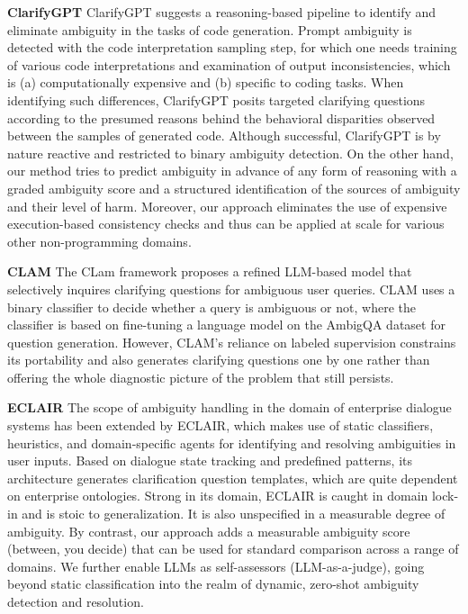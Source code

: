 \documentclass[11pt,a4paper]{article}
\begin{document}
\textbf{ClarifyGPT} \cite{mu2023clarifygptempoweringllmbasedcode}
ClarifyGPT suggests a reasoning-based pipeline to identify and eliminate ambiguity in the tasks of code generation. Prompt ambiguity is detected with the code interpretation sampling step, for which one needs training of various code interpretations and examination of output inconsistencies, which is (a) computationally expensive and (b) specific to coding tasks. When identifying such differences, ClarifyGPT posits targeted clarifying questions according to the presumed reasons behind the behavioral disparities observed between the samples of generated code. Although successful, ClarifyGPT is by nature reactive and restricted to binary ambiguity detection. On the other hand, our method tries to predict ambiguity in advance of any form of reasoning with a graded ambiguity score and a structured identification of the sources of ambiguity and their level of harm. Moreover, our approach eliminates the use of expensive execution-based consistency checks and thus can be applied at scale for various other non-programming domains.

\textbf{CLAM} \cite{kuhn2023clamselectiveclarificationambiguous}
The CLam framework proposes a refined LLM-based model that selectively inquires clarifying questions for ambiguous user queries. CLAM uses a binary classifier to decide whether a query is ambiguous or not, where the classifier is based on fine-tuning a language model on the AmbigQA dataset for question generation. However, CLAM's reliance on labeled supervision constrains its portability and also generates clarifying questions one by one rather than offering the whole diagnostic picture of the problem that still persists.

\textbf{ECLAIR} \cite{murzaku2025eclairenhancedclarificationinteractive}
The scope of ambiguity handling in the domain of enterprise dialogue systems has been extended by ECLAIR, which makes use of static classifiers, heuristics, and domain-specific agents for identifying and resolving ambiguities in user inputs. Based on dialogue state tracking and predefined patterns, its architecture generates clarification question templates, which are quite dependent on enterprise ontologies. Strong in its domain, ECLAIR is caught in domain lock-in and is stoic to generalization. It is also unspecified in a measurable degree of ambiguity. By contrast, our approach adds a measurable ambiguity score (between, you decide) that can be used for standard comparison across a range of domains. We further enable LLMs as self-assessors (LLM-as-a-judge), going beyond static classification into the realm of dynamic, zero-shot ambiguity detection and resolution.
\end{document}
